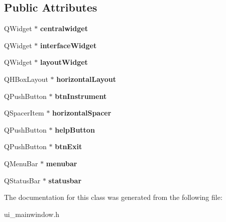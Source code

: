 \subsection*{Public Attributes}
\begin{DoxyCompactItemize}
\item 
\mbox{\label{classUi__MainWindow_a356f1cf3ebda15f1fac59467ee081b74}} 
Q\+Widget $\ast$ {\bfseries centralwidget}
\item 
\mbox{\label{classUi__MainWindow_ade9ab1fce707e990e06789cd43c08099}} 
Q\+Widget $\ast$ {\bfseries interface\+Widget}
\item 
\mbox{\label{classUi__MainWindow_ab96ab0f0578098521fa69a75aa5cdde8}} 
Q\+Widget $\ast$ {\bfseries layout\+Widget}
\item 
\mbox{\label{classUi__MainWindow_acd6fdc9ebacc4b25b834162380d75ce8}} 
Q\+H\+Box\+Layout $\ast$ {\bfseries horizontal\+Layout}
\item 
\mbox{\label{classUi__MainWindow_a05d9e7fd35a5e8b031d38adbcbcda037}} 
Q\+Push\+Button $\ast$ {\bfseries btn\+Instrument}
\item 
\mbox{\label{classUi__MainWindow_a7871ea8c4b6c595d7ccd53960b344719}} 
Q\+Spacer\+Item $\ast$ {\bfseries horizontal\+Spacer}
\item 
\mbox{\label{classUi__MainWindow_a98d7b36ebbc84f6488e5f842724a51ee}} 
Q\+Push\+Button $\ast$ {\bfseries help\+Button}
\item 
\mbox{\label{classUi__MainWindow_a49ff0d3e8f2752efcce9a648693b94ae}} 
Q\+Push\+Button $\ast$ {\bfseries btn\+Exit}
\item 
\mbox{\label{classUi__MainWindow_adf43d9a67adaec750aaa956b5e082f09}} 
Q\+Menu\+Bar $\ast$ {\bfseries menubar}
\item 
\mbox{\label{classUi__MainWindow_a1687cceb1e2787aa1f83e50433943a91}} 
Q\+Status\+Bar $\ast$ {\bfseries statusbar}
\end{DoxyCompactItemize}


The documentation for this class was generated from the following file\+:\begin{DoxyCompactItemize}
\item 
ui\+\_\+mainwindow.\+h\end{DoxyCompactItemize}
